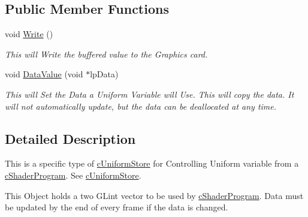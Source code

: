\subsection*{Public Member Functions}
\begin{DoxyCompactItemize}
\item 
\hypertarget{classc_uniform_int_vector2_ae3d8d47f6b6ef6d73e9f8c7dd96447d6}{
void \hyperlink{classc_uniform_int_vector2_ae3d8d47f6b6ef6d73e9f8c7dd96447d6}{Write} ()}
\label{classc_uniform_int_vector2_ae3d8d47f6b6ef6d73e9f8c7dd96447d6}

\begin{DoxyCompactList}\small\item\em This will Write the buffered value to the Graphics card. \end{DoxyCompactList}\item 
\hypertarget{classc_uniform_int_vector2_a4f51dcaee76f717893e827739faa9839}{
void \hyperlink{classc_uniform_int_vector2_a4f51dcaee76f717893e827739faa9839}{DataValue} (void $\ast$lpData)}
\label{classc_uniform_int_vector2_a4f51dcaee76f717893e827739faa9839}

\begin{DoxyCompactList}\small\item\em This will Set the Data a Uniform Variable will Use. This will copy the data. It will not automatically update, but the data can be deallocated at any time. \end{DoxyCompactList}\end{DoxyCompactItemize}


\subsection{Detailed Description}
This is a specific type of \hyperlink{classc_uniform_store}{cUniformStore} for Controlling Uniform variable from a \hyperlink{classc_shader_program}{cShaderProgram}. See \hyperlink{classc_uniform_store}{cUniformStore}. 

This Object holds a two GLint vector to be used by \hyperlink{classc_shader_program}{cShaderProgram}. Data must be updated by the end of every frame if the data is changed. 